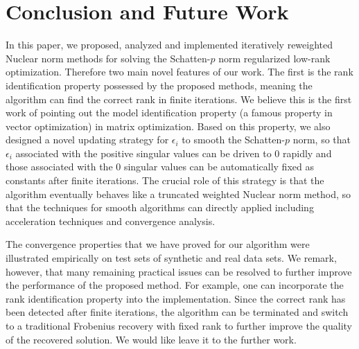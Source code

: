 \documentclass[twoside,11pt]{article}
\numberwithin{equation}{section}
\begin{document}





\section{Conclusion and Future Work}
In this paper, we proposed, analyzed and implemented iteratively reweighted Nuclear norm methods 
for solving the Schatten-$p$ norm regularized low-rank optimization. 
Therefore two main novel features of our work.   The first is the 
rank identification property possessed by the proposed methods, meaning the algorithm can find the 
correct rank in finite iterations.  We believe this is the first work of 
pointing out the model identification property (a famous property in vector optimization) in 
matrix optimization.  Based on this property,  we also designed a novel updating strategy 
for $\epsilon_i$ to smooth the Schatten-$p$ norm, so that $\epsilon_i$ associated with the positive 
singular values can be driven to 0 rapidly and those associated with the 0 singular values can be 
automatically  fixed  as constants after finite iterations. The crucial role of this strategy is that the algorithm 
eventually behaves like a truncated weighted Nuclear norm method, so that the techniques for smooth 
algorithms can directly applied including acceleration techniques and convergence analysis. 

The convergence properties that we have proved for our algorithm were illustrated empirically on 
test sets of synthetic and real data sets. We remark, however, that many remaining practical issues 
 can be resolved to further improve the performance of the proposed method.  For example,  
 one can incorporate the rank identification property into the implementation. Since the correct 
 rank has been detected after finite iterations, the algorithm can be terminated and switch to a 
 traditional Frobenius recovery with fixed rank to further improve the quality of the recovered solution. 
 We would like leave it to the further work. 
\end{document}
